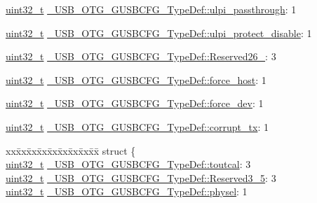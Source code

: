 \begin{DoxyCompactItemize}
\item 
\hyperlink{stdint_8h_a435d1572bf3f880d55459d9805097f62}{uint32\-\_\-t} \hyperlink{group___u_s_b___o_t_g___d_r_i_v_e_r_ga2cf182a5e9dc99ec69d9b6f686a42c62}{\-\_\-\-U\-S\-B\-\_\-\-O\-T\-G\-\_\-\-G\-U\-S\-B\-C\-F\-G\-\_\-\-Type\-Def\-::ulpi\-\_\-passthrough}\-: 1
\item 
\hyperlink{stdint_8h_a435d1572bf3f880d55459d9805097f62}{uint32\-\_\-t} \hyperlink{group___u_s_b___o_t_g___d_r_i_v_e_r_ga356191a03964927676f4b6734d28fda2}{\-\_\-\-U\-S\-B\-\_\-\-O\-T\-G\-\_\-\-G\-U\-S\-B\-C\-F\-G\-\_\-\-Type\-Def\-::ulpi\-\_\-protect\-\_\-disable}\-: 1
\item 
\hyperlink{stdint_8h_a435d1572bf3f880d55459d9805097f62}{uint32\-\_\-t} \hyperlink{group___u_s_b___o_t_g___d_r_i_v_e_r_ga3a67acf742f6ed9acbfd3a181ab5bb92}{\-\_\-\-U\-S\-B\-\_\-\-O\-T\-G\-\_\-\-G\-U\-S\-B\-C\-F\-G\-\_\-\-Type\-Def\-::\-Reserved26\-\_}\-: 3
\item 
\hyperlink{stdint_8h_a435d1572bf3f880d55459d9805097f62}{uint32\-\_\-t} \hyperlink{group___u_s_b___o_t_g___d_r_i_v_e_r_ga1f36d10fc1b42a0a698de7c934f2e0e7}{\-\_\-\-U\-S\-B\-\_\-\-O\-T\-G\-\_\-\-G\-U\-S\-B\-C\-F\-G\-\_\-\-Type\-Def\-::force\-\_\-host}\-: 1
\item 
\hyperlink{stdint_8h_a435d1572bf3f880d55459d9805097f62}{uint32\-\_\-t} \hyperlink{group___u_s_b___o_t_g___d_r_i_v_e_r_ga5644ae82a540198fc40e0dce7fd1ca24}{\-\_\-\-U\-S\-B\-\_\-\-O\-T\-G\-\_\-\-G\-U\-S\-B\-C\-F\-G\-\_\-\-Type\-Def\-::force\-\_\-dev}\-: 1
\item 
\hyperlink{stdint_8h_a435d1572bf3f880d55459d9805097f62}{uint32\-\_\-t} \hyperlink{group___u_s_b___o_t_g___d_r_i_v_e_r_gad8162e80af3e0626d1a713bf558ead0a}{\-\_\-\-U\-S\-B\-\_\-\-O\-T\-G\-\_\-\-G\-U\-S\-B\-C\-F\-G\-\_\-\-Type\-Def\-::corrupt\-\_\-tx}\-: 1
\item 
\begin{tabbing}
xx\=xx\=xx\=xx\=xx\=xx\=xx\=xx\=xx\=\kill
struct \{\\
\>\hyperlink{stdint_8h_a435d1572bf3f880d55459d9805097f62}{uint32\_t} \hyperlink{group___u_s_b___o_t_g___d_r_i_v_e_r_ga5ff2c9d380b6cf9797c300917954d000}{\_USB\_OTG\_GUSBCFG\_TypeDef::toutcal}: 3\\
\>\hyperlink{stdint_8h_a435d1572bf3f880d55459d9805097f62}{uint32\_t} \hyperlink{group___u_s_b___o_t_g___d_r_i_v_e_r_gaaac4ee1a7a9421a2b6475a1696cb4746}{\_USB\_OTG\_GUSBCFG\_TypeDef::Reserved3\_5}: 3\\
\>\hyperlink{stdint_8h_a435d1572bf3f880d55459d9805097f62}{uint32\_t} \hyperlink{group___u_s_b___o_t_g___d_r_i_v_e_r_gaef0dede35984b2d149038b79a2baed90}{\_USB\_OTG\_GUSBCFG\_TypeDef::physel}: 1\\

\end{tabbing}
\end{DoxyCompactItemize}
